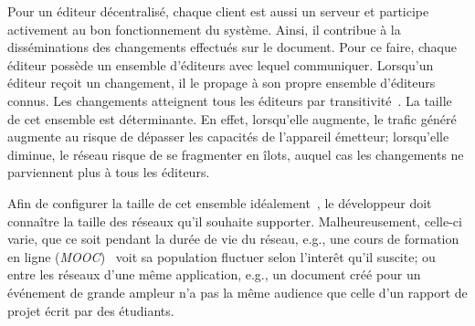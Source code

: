 \begin{itemize}
Pour un éditeur décentralisé, chaque client est aussi un serveur et participe
activement au bon fonctionnement du système. Ainsi, il contribue à la
disséminations des changements effectués sur le document. Pour ce faire, chaque
éditeur possède un ensemble d'éditeurs avec lequel communiquer. Lorsqu'un
éditeur reçoit un changement, il le propage à son propre ensemble d'éditeurs
connus. Les changements atteignent tous les éditeurs par
transitivité~\cite{birman1999bimodal}. La taille de cet ensemble est
déterminante. En effet, lorsqu'elle augmente, le trafic généré augmente au
risque de dépasser les capacités de l'appareil émetteur; lorsqu'elle diminue, le
réseau risque de se fragmenter en îlots, auquel cas les changements ne
parviennent plus à tous les éditeurs.

Afin de configurer la taille de cet ensemble idéalement~\cite{erdos1959random},
le développeur doit connaître la taille des réseaux qu'il souhaite
supporter. Malheureusement, celle-ci varie, que ce soit pendant la durée de vie
du réseau, e.g., une cours de formation en ligne
(\emph{MOOC})~\cite{breslow2013studying} voit sa population fluctuer selon
l'interêt qu'il suscite; ou entre les réseaux d'une même application, e.g., un
document créé pour un événement de grande ampleur n'a pas la même audience que
celle d'un rapport de projet écrit par des étudiants.



\end{itemize}
